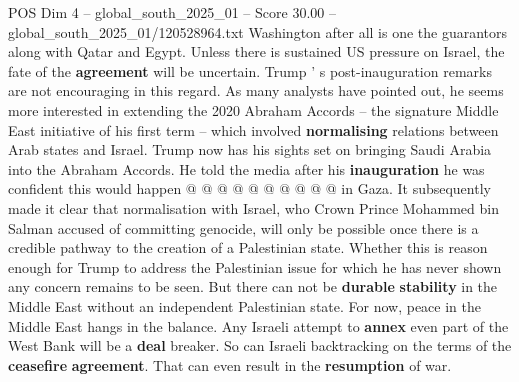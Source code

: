 \begin{textsample}{POS Dim 4 – global\_south\_2025\_01 – Score 30.00 – global\_south\_2025\_01/120528964.txt}
Washington after all is one the guarantors along with Qatar and Egypt.
Unless there is sustained US pressure on Israel, the fate of the \textbf{agreement} will be uncertain.
Trump ' s post-inauguration remarks are not encouraging in this regard.
As many analysts have pointed out, he seems more interested in extending the 2020 Abraham Accords -- the signature Middle East initiative of his first term -- which involved \textbf{normalising} relations between Arab states and Israel.
Trump now has his sights set on bringing Saudi Arabia into the Abraham Accords.
He told the media after his \textbf{inauguration} he was confident this would happen @ @ @ @ @ @ @ @ @ @ in Gaza.
It subsequently made it clear that normalisation with Israel, who Crown Prince Mohammed bin Salman accused of committing genocide, will only be possible once there is a credible pathway to the creation of a Palestinian state.
Whether this is reason enough for Trump to address the Palestinian issue for which he has never shown any concern remains to be seen.
But there can not be \textbf{durable} \textbf{stability} in the Middle East without an independent Palestinian state.
For now, peace in the Middle East hangs in the balance.
Any Israeli attempt to \textbf{annex} even part of the West Bank will be a \textbf{deal} breaker.
So can Israeli backtracking on the terms of the \textbf{ceasefire} \textbf{agreement}.
That can even result in the \textbf{resumption} of war.

\end{textsample}
